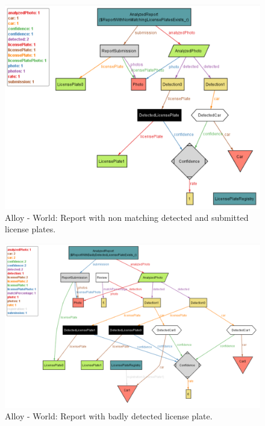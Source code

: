 \begin{figure}[H]
    \centering
    \includegraphics[width=\textwidth]{Images/alloy/2.png}
    \caption{\label{fig:alloy}Alloy - World: Report with non matching detected and submitted license plates.}
\end{figure}

\begin{figure}[H]
    \centering
    \includegraphics[width=\textwidth]{Images/alloy/3.png}
    \caption{\label{fig:alloy}Alloy - World: Report with badly detected license plate.}
\end{figure}

